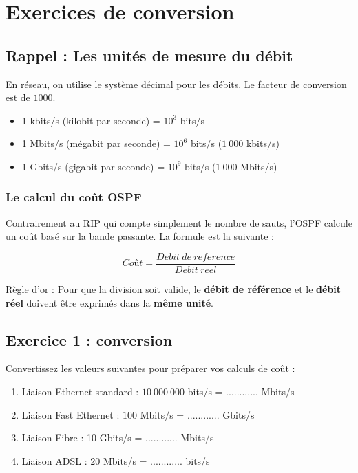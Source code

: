 \chapter*{Exercices de conversion}


\section*{Rappel : Les unités de mesure du débit}
En réseau, on utilise le système décimal pour les débits. Le facteur de conversion est de $1 000$.
\begin{itemize}
    \item 1 kbits/s (kilobit par seconde) = $10^3$ bits/s
    \item 1 Mbits/s (mégabit par seconde) = $10^6$ bits/s ($1\ 000$ kbits/s)
    \item 1 Gbits/s (gigabit par seconde) = $10^9$ bits/s ($1\ 000$ Mbits/s)
\end{itemize}

\subsection*{Le calcul du coût OSPF}
Contrairement au RIP qui compte simplement le nombre de sauts, l'OSPF calcule un coût basé sur la bande passante. La formule est la suivante :

$$Coût = \frac{Debit\ de\ reference}{Debit\ reel}$$

\begin{Comprendre}
    Règle d'or : Pour que la division soit valide, le \textbf{débit de référence} et le \textbf{débit réel} doivent être exprimés dans la \textbf{même unité}.
\end{Comprendre}


\section*{Exercice 1 : conversion}
Convertissez les valeurs suivantes pour préparer vos calculs de coût :
\begin{enumerate}
    \item Liaison Ethernet standard : $10\ 000\ 000$ bits/s = ............ Mbits/s
    \item Liaison Fast Ethernet : $100$ Mbits/s = ............ Gbits/s
    \item Liaison Fibre : 10 Gbits/s = ............ Mbits/s
    \item Liaison ADSL : $20$ Mbits/s = ............ bits/s
\end{enumerate}



